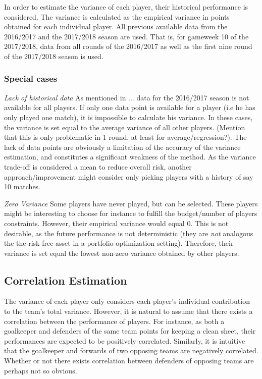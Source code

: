 In order to estimate the variance of each player, their historical performance is considered. The variance is calculated as the empirical variance in points obtained for each individual player. All previous available data from the 2016/2017 and the 2017/2018 season are used. That is, for gameweek 10 of the 2017/2018, data from all rounds of the 2016/2017 as well as the first nine round of the 2017/2018 season is used.\newpar

\subsubsection{Special cases}
\textit{Lack of historical data}\newline
As mentioned in ... data for the 2016/2017 season is not available for all players. If only one data point is available for a player (i.e he has only played one match), it is impossible to calculate his variance. In these cases, the variance is set equal to the average variance of all other players. (Mention that this is only problematic in 1 round, at least for average/regression?). The lack of data points are obviously a limitation of the accuracy of the variance estimation, and constitutes a significant weakness of the method. As the variance trade-off is considered a mean to reduce overall risk, another approach/improvement might consider only picking players with a history of say 10 matches. \newpar

\textit{Zero Variance}\newline
Some players have never played, but can be selected. These players might be interesting to choose for instance to fulfill the budget/number of players constraints. However, their empirical variance would equal 0. This is not desirable, as the future performance is not deterministic (they are \textit{not} analogous the the risk-free asset in a portfolio optimization setting). Therefore, their variance is set equal the lowest non-zero variance obtained by other players.

\subsection{Correlation Estimation}
The variance of each player only considers each player's individual contribution to the team's total variance. However, it is natural to assume that there exists a correlation between the performance of players. For instance, as both a goalkeeper and defenders of the same team points for keeping a clean sheet, their performances are expected to be positively correlated. Similarly, it is intuitive that the goalkeeper and forwards of two opposing teams are negatively correlated. Whether or not there exists correlation between defenders of opposing teams are perhaps not so obvious. \newpar

